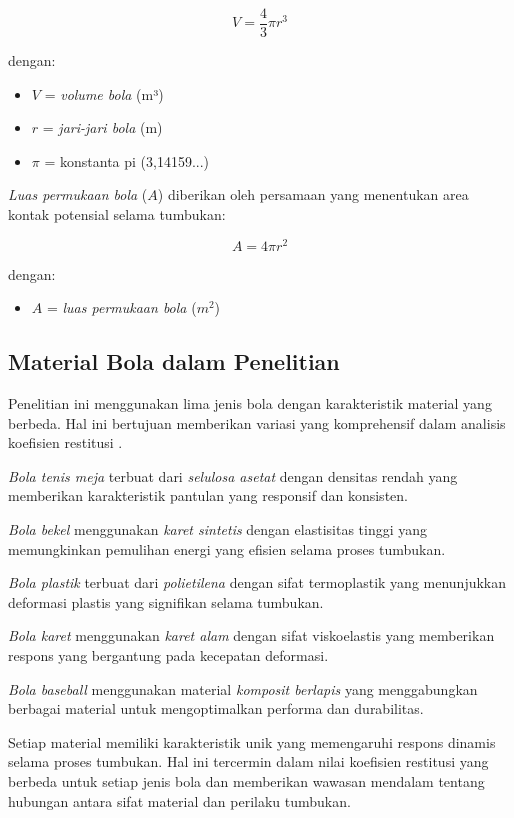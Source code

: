 \begin{equation}
    V = \frac{4}{3}\pi r^3
\end{equation}

dengan:
\begin{itemize}
    \item $V$ = \textit{volume bola} (m³)
    \item $r$ = \textit{jari-jari bola} (m)
    \item $\pi$ = konstanta pi (3,14159...)
\end{itemize}

\textit{Luas permukaan bola} ($A$) diberikan oleh persamaan yang menentukan area kontak potensial selama tumbukan:

\begin{equation}
    A = 4\pi r^2
\end{equation}

dengan:
\begin{itemize}
    \item $A$ = \textit{luas permukaan bola} ($m^2$)
\end{itemize}

\subsection{Material Bola dalam Penelitian}
Penelitian ini menggunakan lima jenis bola dengan karakteristik material yang berbeda. Hal ini bertujuan memberikan variasi yang komprehensif dalam analisis koefisien restitusi \citep{avancini2020physical}. 

\textit{Bola tenis meja} terbuat dari \textit{selulosa asetat} dengan densitas rendah yang memberikan karakteristik pantulan yang responsif dan konsisten. 

\textit{Bola bekel} menggunakan \textit{karet sintetis} dengan elastisitas tinggi yang memungkinkan pemulihan energi yang efisien selama proses tumbukan. 

\textit{Bola plastik} terbuat dari \textit{polietilena} dengan sifat termoplastik yang menunjukkan deformasi plastis yang signifikan selama tumbukan. 

\textit{Bola karet} menggunakan \textit{karet alam} dengan sifat viskoelastis yang memberikan respons yang bergantung pada kecepatan deformasi. 

\textit{Bola baseball} menggunakan material \textit{komposit berlapis} yang menggabungkan berbagai material untuk mengoptimalkan performa dan durabilitas. 

Setiap material memiliki karakteristik unik yang memengaruhi respons dinamis selama proses tumbukan. Hal ini tercermin dalam nilai koefisien restitusi yang berbeda untuk setiap jenis bola dan memberikan wawasan mendalam tentang hubungan antara sifat material dan perilaku tumbukan.
